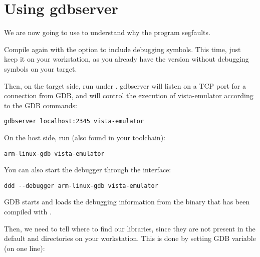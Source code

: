 


\section{Using gdbserver}

We are now going to use  to understand why the program
segfaults.

Compile  again with the  option to
include debugging symbols. This time, just keep it on your workstation,
as you already have the version without debugging symbols on your target.

Then, on the target side, run  under
. gdbserver will listen on a TCP port for a connection
from GDB, and will control the execution of vista-emulator according
to the GDB commands:

\begin{verbatim}
gdbserver localhost:2345 vista-emulator
\end{verbatim}

On the host side, run  (also found in your toolchain):
\begin{verbatim}
arm-linux-gdb vista-emulator
\end{verbatim}

You can also start the debugger through the  interface:
\begin{verbatim}
ddd --debugger arm-linux-gdb vista-emulator
\end{verbatim}

GDB starts and loads the debugging information from the
 binary that has been compiled with .

Then, we need to tell where to find our libraries, since they are not
present in the default  and  directories on
your workstation. This is done by setting GDB  variable
(on one line):

